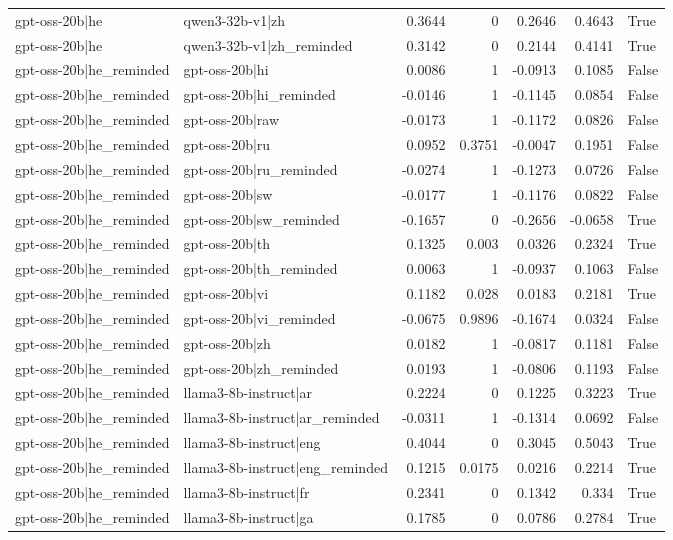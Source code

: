 \begin{table}
\begin{tabular}{l l r r r r l}
gpt-oss-20b|he & qwen3-32b-v1|zh & 0.3644 & 0 & 0.2646 & 0.4643 & True \\
gpt-oss-20b|he & qwen3-32b-v1|zh_reminded & 0.3142 & 0 & 0.2144 & 0.4141 & True \\
gpt-oss-20b|he_reminded & gpt-oss-20b|hi & 0.0086 & 1 & -0.0913 & 0.1085 & False \\
gpt-oss-20b|he_reminded & gpt-oss-20b|hi_reminded & -0.0146 & 1 & -0.1145 & 0.0854 & False \\
gpt-oss-20b|he_reminded & gpt-oss-20b|raw & -0.0173 & 1 & -0.1172 & 0.0826 & False \\
gpt-oss-20b|he_reminded & gpt-oss-20b|ru & 0.0952 & 0.3751 & -0.0047 & 0.1951 & False \\
gpt-oss-20b|he_reminded & gpt-oss-20b|ru_reminded & -0.0274 & 1 & -0.1273 & 0.0726 & False \\
gpt-oss-20b|he_reminded & gpt-oss-20b|sw & -0.0177 & 1 & -0.1176 & 0.0822 & False \\
gpt-oss-20b|he_reminded & gpt-oss-20b|sw_reminded & -0.1657 & 0 & -0.2656 & -0.0658 & True \\
gpt-oss-20b|he_reminded & gpt-oss-20b|th & 0.1325 & 0.003 & 0.0326 & 0.2324 & True \\
gpt-oss-20b|he_reminded & gpt-oss-20b|th_reminded & 0.0063 & 1 & -0.0937 & 0.1063 & False \\
gpt-oss-20b|he_reminded & gpt-oss-20b|vi & 0.1182 & 0.028 & 0.0183 & 0.2181 & True \\
gpt-oss-20b|he_reminded & gpt-oss-20b|vi_reminded & -0.0675 & 0.9896 & -0.1674 & 0.0324 & False \\
gpt-oss-20b|he_reminded & gpt-oss-20b|zh & 0.0182 & 1 & -0.0817 & 0.1181 & False \\
gpt-oss-20b|he_reminded & gpt-oss-20b|zh_reminded & 0.0193 & 1 & -0.0806 & 0.1193 & False \\
gpt-oss-20b|he_reminded & llama3-8b-instruct|ar & 0.2224 & 0 & 0.1225 & 0.3223 & True \\
gpt-oss-20b|he_reminded & llama3-8b-instruct|ar_reminded & -0.0311 & 1 & -0.1314 & 0.0692 & False \\
gpt-oss-20b|he_reminded & llama3-8b-instruct|eng & 0.4044 & 0 & 0.3045 & 0.5043 & True \\
gpt-oss-20b|he_reminded & llama3-8b-instruct|eng_reminded & 0.1215 & 0.0175 & 0.0216 & 0.2214 & True \\
gpt-oss-20b|he_reminded & llama3-8b-instruct|fr & 0.2341 & 0 & 0.1342 & 0.334 & True \\
gpt-oss-20b|he_reminded & llama3-8b-instruct|ga & 0.1785 & 0 & 0.0786 & 0.2784 & True \\

\end{tabular}
\end{table}
